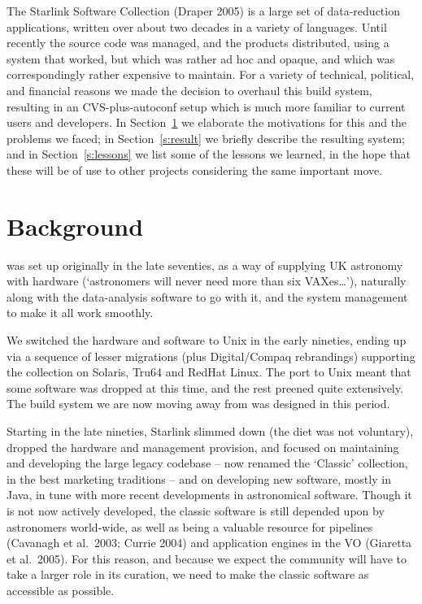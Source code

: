 \documentclass[11pt,twoside]{article}
\begin{document}
The Starlink Software Collection (Draper 2005) is a large set of
data-reduction 
applications, written over about two decades in a variety of
languages.  Until recently the source code was managed, and the
products distributed, using a system that worked, but which was
rather ad hoc and opaque, and which was correspondingly rather
expensive to maintain.  For a variety of technical, political, and financial
reasons we made the decision to overhaul this build system, resulting
in an CVS-plus-autoconf setup which is much more familiar to current users and
developers.   In Section~\ref{s:background} we elaborate the
motivations for this and the problems we faced; in
Section~\ref{s:result} we briefly describe the resulting system; and
in Section~\ref{s:lessons} we list some of the lessons we learned, in
the hope that these will be of use to other projects considering the
same important move.


\section{Background}
\label{s:background}


 was set up
originally in the late seventies, as a way of supplying UK astronomy
with hardware (`astronomers will never need more than six
VAXes\dots'), naturally along with the data-analysis software to go
with it, and the system management to make it all work smoothly.

We switched the hardware and software to Unix in the early nineties,
ending up via a sequence of lesser migrations (plus Digital/Compaq
rebrandings) supporting the collection on Solaris, Tru64 and RedHat
Linux.  The port to Unix meant that some software was dropped at this
time, and the rest preened quite extensively.  The build system we are
now moving away from was designed in this period.

Starting in the late nineties, Starlink slimmed down (the diet was not
voluntary), dropped the hardware and management provision, and focused
on maintaining and developing the large legacy codebase -- now renamed
the `Classic' collection, in the best marketing traditions -- and on
developing new software, mostly in Java, in tune with more recent
developments in astronomical software.  Though it is not now actively
developed, the classic software is still depended upon by astronomers
world-wide, as well as being a valuable resource for pipelines
(Cavanagh et al.\ 2003; Currie 2004) and application engines in the VO
(Giaretta et al.\ 2005).
For this reason, and because we expect the community will have to take
a larger role in its curation, we need to make the classic software as
accessible as possible.
\end{document}
